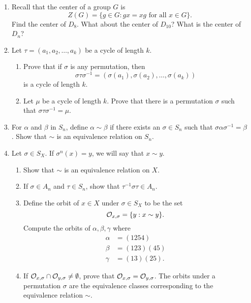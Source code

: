 {\begin{enumerate}
 
\item
Recall that the {\bfi center\/} of a group $G$ is
\[
Z(G) = \{ g \in G : \mbox{$gx = xg$ for all $x \in G$} \}.
\]
Find the center of $D_8$. What about the center of $D_{10}$? What is
the center of $D_n$? 
 
 
\item
Let $\tau = (a_1, a_2, \ldots, a_k)$ be a cycle of length $k$.
\begin{enumerate}
 
 \item
Prove that if $\sigma$ is any permutation, then
\[
\sigma \tau \sigma^{-1 } = ( \sigma(a_1), \sigma(a_2), \ldots,
\sigma(a_k))
\]
is a cycle of length $k$.
 
 \item
Let $\mu$ be a cycle of length $k$. Prove that there is a permutation
$\sigma$ such that $\sigma \tau \sigma^{-1 } = \mu$.
 
\end{enumerate}
 
 
\item
For $\alpha$ and $\beta$ in $S_n$, define $\alpha \sim \beta$ if there
exists an $\sigma \in S_n$ such that $\sigma \alpha \sigma^{-1} =
\beta$.  Show that $\sim$ is an equivalence relation on $S_n$.
 
 
\item
Let $\sigma \in S_X$. If $\sigma^n(x) = y$, we will say that $x \sim
y$. 
\begin{enumerate}
 
 \item
Show that $\sim$ is an equivalence relation on $X$.
 
 \item
If $\sigma \in A_n$ and $\tau \in S_n$, show that $\tau^{-1} \sigma
\tau \in A_n$. 
 
\item
Define the {\bfi orbit} of $x \in X$ under $\sigma \in
S_X$ to be the set 
\[
{\cal O}_{x, \sigma} = \{ y : x \sim y  \}.
\]
Compute the orbits of $\alpha, \beta, \gamma$ where
\begin{align*}
\alpha & = (1254) \\
\beta & = (123)(45)\\
\gamma & = (13)(25).
\end{align*}
 
 \item
If ${\cal O}_{x, \sigma} \cap {\cal O}_{y, \sigma} \neq \emptyset$,
prove that ${\cal O}_{x, \sigma} = {\cal O}_{y, \sigma}$.  The orbits
under a permutation $\sigma$ are the equivalence classes corresponding
to the equivalence relation $\sim$.
 

\end{enumerate}
\end{enumerate}}
